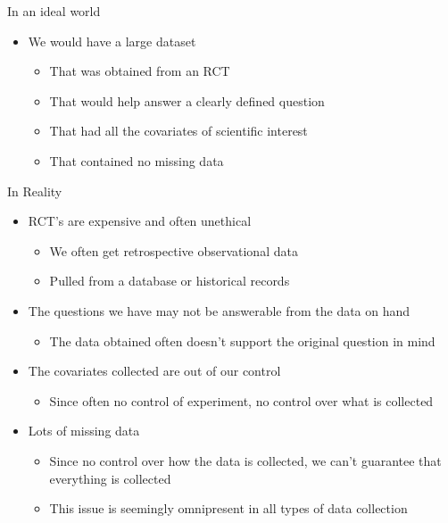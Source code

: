 

\begin{frame}{In an ideal world}
  \begin{itemize}
  \item We would have a large dataset
  \begin{itemize}
   \item That was obtained from an RCT
   \item That would help answer a clearly defined question
   \item That had all the covariates of scientific interest
   \item That contained no missing data
  \end{itemize}

  \end{itemize}
\end{frame}

\begin{frame}{In Reality}

  \begin{itemize}
   \item RCT's are expensive and often unethical
   \begin{itemize}
    \item We often get retrospective observational data
    \item Pulled from a database or historical records
   \end{itemize}

   \item The questions we have may not be answerable from the data on hand
   \begin{itemize}
    \item The data obtained often doesn't support the original question in mind
   \end{itemize}

   \item The covariates collected are out of our control
   \begin{itemize}
    \item Since often no control of experiment, no control over what is collected
   \end{itemize}

   \item Lots of missing data
   \begin{itemize}
    \item Since no control over how the data is collected, we can't guarantee that everything is collected
   \item This issue is seemingly omnipresent in all types of data collection
   \end{itemize}

  \end{itemize}

\end{frame}

